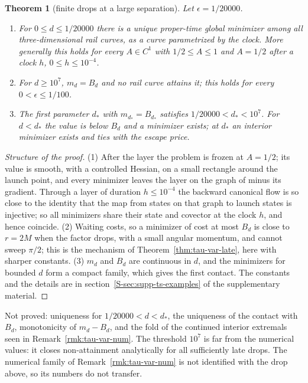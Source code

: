 \documentclass[aip,jmp,amsmath,amssymb,reprint]{revtex4-2}
\theoremstyle{plain}
\newtheorem{theorem}{Theorem}
\theoremstyle{definition}
\begin{document}
\begin{theorem}[finite drops at a large separation]\label{thm:tau-var-drop}
Let $\epsilon=1/20000$.
\begin{enumerate}
\item For $0\le d\le1/20000$ there is a unique proper-time global minimizer among all three-dimensional
  rail curves, as a curve parametrized by the clock. More generally this holds for every
  $A\in C^1$ with $1/2\le A\le1$ and $A=1/2$ after a clock $h$, $0\le h\le10^{-4}$.
\item For $d\ge10^7$, $m_d=B_d$ and no rail curve attains it; this holds for every
  $0<\epsilon\le1/100$.
\item The first parameter $d_*$ with $m_{d_*}=B_{d_*}$ satisfies $1/20000<d_*<10^7$. For $d<d_*$ the value is
  below $B_d$ and a minimizer exists; at $d_*$ an interior minimizer exists and ties with the escape price.
\end{enumerate}
\end{theorem}

\begin{proof}[Structure of the proof]
(1) After the layer the problem is frozen at $A=1/2$; its value is smooth, with a controlled Hessian, on a small
rectangle around the launch point, and every minimizer leaves the layer on the graph of minus its gradient. Through
a layer of duration $h\le10^{-4}$ the backward canonical flow is so close to the identity that the map from
states on that graph to launch states is injective; so all minimizers share their state and covector at the
clock $h$, and hence coincide. (2) Waiting costs, so a minimizer of cost at most $B_d$ is close to $r=2M$ when the
factor drops, with a small angular momentum, and cannot sweep $\pi/2$; this is the mechanism of
Theorem~\ref{thm:tau-var-late}, here with sharper constants. (3) $m_d$ and $B_d$ are continuous in $d$, and the
minimizers for bounded $d$ form a compact family, which gives the first contact. The constants and the
details are in section~\ref{S-sec:supp-ts-examples} of the supplementary material.
\end{proof}

Not proved: uniqueness for $1/20000<d<d_*$, the uniqueness of the contact with $B_d$, monotonicity of
$m_d-B_d$, and the fold of the continued interior extremals seen in Remark~\ref{rmk:tau-var-num}.
The threshold $10^7$ is far from the numerical values: it closes non-attainment analytically for all
sufficiently late drops. The numerical family of Remark~\ref{rmk:tau-var-num} is not identified with the
drop above, so its numbers do not transfer.
\end{document}
